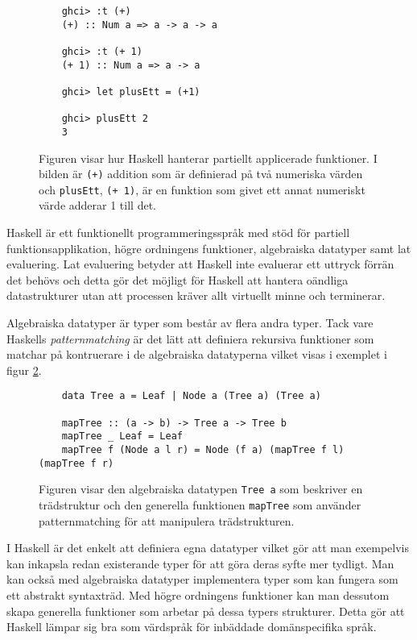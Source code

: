 \documentclass[12pt,a4paper,twoside,openright]{article}
\begin{document}
\begin{figure}[H]
  \begin{verbatim}
    ghci> :t (+)
    (+) :: Num a => a -> a -> a

    ghci> :t (+ 1)
    (+ 1) :: Num a => a -> a

    ghci> let plusEtt = (+1)

    ghci> plusEtt 2
    3
  \end{verbatim}
  \caption{Figuren visar hur Haskell hanterar partiellt applicerade
    funktioner. I bilden är \texttt{(+)} addition som är
    definierad på två numeriska värden och
    \texttt{plusEtt}, \texttt{(+ 1)}, är en
    funktion som givet ett annat numeriskt värde adderar 1 till det.}
  \label{fig:hask_partfunapp}
\end{figure}

Haskell är ett funktionellt programmeringsspråk med stöd för partiell
funktionsapplikation, högre ordningens funktioner, algebraiska
datatyper samt lat evaluering. Lat evaluering betyder att Haskell inte
evaluerar ett uttryck förrän det behövs och detta gör det möjligt för
Haskell att hantera oändliga datastrukturer utan att processen kräver
allt virtuellt minne och terminerar.

Algebraiska datatyper är typer som består av flera andra typer. Tack
vare Haskells \textit{\gls{patternmatching}} är det lätt att definiera rekursiva
funktioner som matchar på kontruerare i de algebraiska datatyperna
vilket visas i exemplet i figur \ref{fig:hask_alg_type}.

\begin{figure}[H]
  \begin{verbatim}
    data Tree a = Leaf | Node a (Tree a) (Tree a)

    mapTree :: (a -> b) -> Tree a -> Tree b
    mapTree _ Leaf = Leaf
    mapTree f (Node a l r) = Node (f a) (mapTree f l) (mapTree f r)
  \end{verbatim}
  \caption{Figuren visar den algebraiska datatypen
    \texttt{Tree a} som beskriver en trädstruktur och den
    generella funktionen \texttt{mapTree} som använder
    \gls{patternmatching} för att manipulera trädstrukturen.}
  \label{fig:hask_alg_type}
\end{figure}

I Haskell är det enkelt att definiera egna datatyper vilket gör att
man exempelvis kan inkapsla redan existerande typer för att göra deras
syfte mer tydligt. Man kan också med algebraiska datatyper
implementera typer som kan fungera som ett abstrakt syntaxträd. Med
högre ordningens funktioner kan man dessutom skapa generella
funktioner som arbetar på dessa typers strukturer. Detta gör att
Haskell lämpar sig bra som värdspråk för inbäddade domänspecifika
språk.
\end{document}
